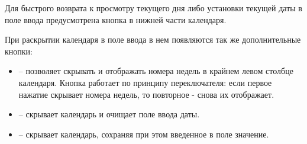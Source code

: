 Для быстрого возврата к просмотру текущего дня либо установки текущей даты в поле ввода предусмотрена кнопка  в нижней части календаря. 

При раскрытии календаря в поле ввода в нем появляются так же дополнительные кнопки:

\begin{itemize}
	\item {} -- позволяет скрывать и отображать номера недель в крайнем левом столбце календаря. Кнопка работает по принципу переключателя: если первое нажатие скрывает номера недель, то повторное - снова их отображает.
	\item {} -- скрывает календарь и очищает поле ввода даты.
	\item {} -- скрывает календарь, сохраняя при этом введенное в поле значение. 
\end{itemize}